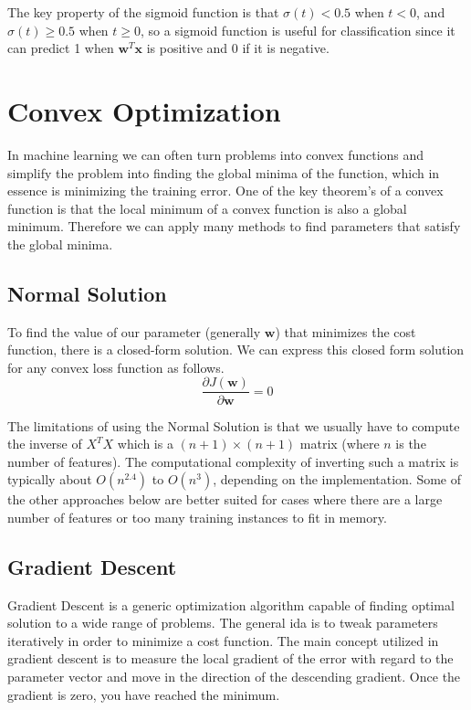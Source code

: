 \documentclass[12pt]{article}
\begin{document}
        The key property of the sigmoid function is that $\sigma(t) < 0.5$ when $t < 0$, and $\sigma(t) \geq 0.5$ when $t \geq 0$, so a sigmoid function is useful for classification since it can predict 1 when $\boldsymbol{w}^T\boldsymbol{x}$
        is positive and 0 if it is negative.

\section{Convex Optimization}
    In machine learning we can often turn problems into convex functions and simplify the problem into finding the global minima of the function, which in essence is minimizing the training error. One of the key theorem's of a convex function is 
    that the local minimum of a convex function is also a global minimum. Therefore we can apply many methods to find parameters that satisfy the global minima.

    \subsection{Normal Solution}
        To find the value of our parameter (generally $\boldsymbol{w}$) that minimizes the cost function, there is a closed-form solution. We can express this closed form solution for any convex loss function as follows.
        $$ \frac{\partial J(\boldsymbol{w})}{\partial \boldsymbol{w}} = 0 $$
        
        The limitations of using the Normal Solution is that we usually have to compute the inverse of $X^TX$ which is a $(n+1) \times (n+1)$ matrix (where $n$ is the number of features). The computational complexity of inverting 
        such a matrix is typically about $O(n^{2.4})$ to $O(n^{3})$, depending on the implementation. Some of the other approaches below are better suited for cases where there are a large number of features or too many training instances
        to fit in memory.

    \subsection{Gradient Descent}
        Gradient Descent is a generic optimization algorithm capable of finding optimal solution to a wide range of problems. The general ida is to tweak parameters iteratively in order to minimize a cost function. The main concept utilized in
        gradient descent is to measure the local gradient of the error with regard to the parameter vector and move in the direction of the descending gradient. Once the gradient is zero, you have reached the minimum.
\end{document}
